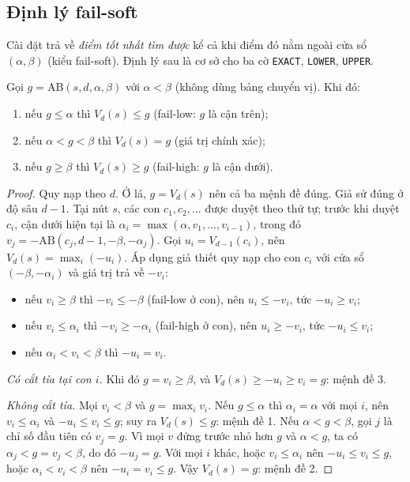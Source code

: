 \subsection{Định lý fail-soft}
\label{sec:cs-fail-soft}
Cài đặt trả về \emph{điểm tốt nhất tìm được} kể cả khi điểm đó nằm ngoài cửa sổ $(\alpha,\beta)$ (kiểu
fail-soft). Định lý sau là cơ sở cho ba cờ \texttt{EXACT}, \texttt{LOWER}, \texttt{UPPER}.

\begin{dinhly}
\label{dl:cs-fail-soft}
Gọi $g=\mathrm{AB}(s,d,\alpha,\beta)$ với $\alpha<\beta$ (không dùng bảng chuyển vị). Khi đó:
\begin{enumerate}
  \item nếu $g\le\alpha$ thì $V_d(s)\le g$ (fail-low: $g$ là cận trên);
  \item nếu $\alpha<g<\beta$ thì $V_d(s)=g$ (giá trị chính xác);
  \item nếu $g\ge\beta$ thì $V_d(s)\ge g$ (fail-high: $g$ là cận dưới).
\end{enumerate}
\end{dinhly}
\begin{proof}
Quy nạp theo $d$. Ở lá, $g=V_d(s)$ nên cả ba mệnh đề đúng. Giả sử đúng ở độ sâu $d-1$. Tại nút $s$, các con
$c_1,c_2,\dots$ được duyệt theo thứ tự; trước khi duyệt $c_i$, cận dưới hiện tại là
$\alpha_i=\max(\alpha,v_1,\dots,v_{i-1})$, trong đó $v_j=-\mathrm{AB}(c_j,d-1,-\beta,-\alpha_j)$. Gọi
$u_i=V_{d-1}(c_i)$, nên $V_d(s)=\max_i(-u_i)$. Áp dụng giả thiết quy nạp cho con $c_i$ với cửa sổ
$(-\beta,-\alpha_i)$ và giá trị trả về $-v_i$:
\begin{itemize}
  \item nếu $v_i\ge\beta$ thì $-v_i\le-\beta$ (fail-low ở con), nên $u_i\le -v_i$, tức $-u_i\ge v_i$;
  \item nếu $v_i\le\alpha_i$ thì $-v_i\ge-\alpha_i$ (fail-high ở con), nên $u_i\ge -v_i$, tức $-u_i\le v_i$;
  \item nếu $\alpha_i<v_i<\beta$ thì $-u_i=v_i$.
\end{itemize}
\emph{Có cắt tỉa tại con $i$.} Khi đó $g=v_i\ge\beta$, và $V_d(s)\ge -u_i\ge v_i=g$: mệnh đề 3.

\emph{Không cắt tỉa.} Mọi $v_i<\beta$ và $g=\max_i v_i$. Nếu $g\le\alpha$ thì $\alpha_i=\alpha$ với mọi $i$,
nên $v_i\le\alpha_i$ và $-u_i\le v_i\le g$; suy ra $V_d(s)\le g$: mệnh đề 1. Nếu $\alpha<g<\beta$, gọi $j$ là
chỉ số đầu tiên có $v_j=g$. Vì mọi $v$ đứng trước nhỏ hơn $g$ và $\alpha<g$, ta có $\alpha_j<g=v_j<\beta$, do
đó $-u_j=g$. Với mọi $i$ khác, hoặc $v_i\le\alpha_i$ nên $-u_i\le v_i\le g$, hoặc $\alpha_i<v_i<\beta$ nên
$-u_i=v_i\le g$. Vậy $V_d(s)=g$: mệnh đề 2.
\end{proof}

